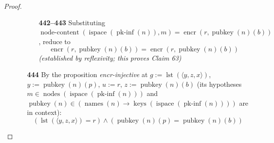 \documentclass[11pt]{article}
\theoremstyle{plain}
\begin{document}
\begin{proof}
\begin{itemize}[leftmargin=2.8em, itemsep=4pt, parsep=1pt]
\begin{itemize}[leftmargin=2.8em, itemsep=4pt, parsep=1pt]
\begin{itemize}[leftmargin=2.8em, itemsep=4pt, parsep=1pt]
  \item[\textbf{442--443}] Substituting $\operatorname{node\text{-}content}(\operatorname{ispace}(\operatorname{pk\text{-}inf}(n)), m) = \operatorname{encr}(r, \operatorname{pubkey}(n)(b))$, reduce to
\begin{equation*}
\operatorname{encr}(r, \operatorname{pubkey}(n)(b)) = \operatorname{encr}(r, \operatorname{pubkey}(n)(b))
\end{equation*}
  \emph{(established by reflexivity; this proves Claim 63)}
  \end{itemize}
  \item[\textbf{444}] By the proposition \emph{encr-injective} at $g := \operatorname{lst}(\langle y, z, x \rangle)$, $y := \operatorname{pubkey}(n)(p)$, $u := r$, $z := \operatorname{pubkey}(n)(b)$ (its hypotheses $m \in \operatorname{nodes}(\operatorname{ispace}(\operatorname{pk\text{-}inf}(n)))$ and $\operatorname{pubkey}(n) \in (\operatorname{names}(n) \to \operatorname{keys}(\operatorname{ispace}(\operatorname{pk\text{-}inf}(n))))$ are in context):
\begin{equation*}
(\operatorname{lst}(\langle y, z, x \rangle) = r) \wedge (\operatorname{pubkey}(n)(p) = \operatorname{pubkey}(n)(b))
\end{equation*}


\end{itemize}
\end{itemize}
\end{proof}
\end{document}
